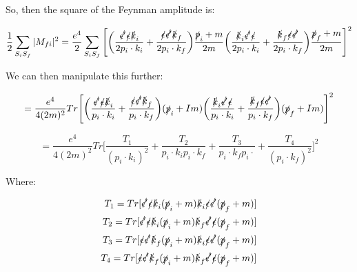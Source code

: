 \documentclass[a4]{article}
\begin{document}
    So, then the square of the Feynman amplitude is:

    \begin{equation}
        \frac{1}{2} \sum_{S_i S_f} |M_{fi}|^2 = \frac{e^4}{2} \sum_{S_i S_f} \Bigg[\bigg(\frac{\slashed{\epsilon'} \slashed{\epsilon} \slashed{k}_i}{2 p_i \cdot k_i} + \frac{\slashed{\epsilon} \slashed{\epsilon'} \slashed{k}_f}{2 p_i \cdot k_f} \bigg) \frac{\slashed{p}_i + m}{2 m} \bigg(\frac{\slashed{k}_i \slashed{\epsilon'} \slashed{\epsilon}}{2 p_i \cdot k_i} + \frac{\slashed{k}_f \slashed{\epsilon} \slashed{\epsilon'}}{2 p_i \cdot k_f} \bigg) \frac{\slashed{p}_f + m}{2 m} \Bigg]^2
    \end{equation}

    We can then manipulate this further:

    \begin{equation}
        = \frac{e^4}{4 (2m)^2} Tr \Bigg[ \bigg(\frac{\slashed{\epsilon'} \slashed{\epsilon} \slashed{k}_i}{p_i \cdot k_i} + \frac{\slashed{\epsilon} \slashed{\epsilon'} \slashed{k}_f}{p_i \cdot k_f} \bigg) (\slashed{p}_i + I m) \bigg(\frac{\slashed{k}_i \slashed{\epsilon'} \slashed{\epsilon}}{p_i \cdot k_i} + \frac{\slashed{k}_f \slashed{\epsilon} \slashed{\epsilon'}}{p_i \cdot k_f} \bigg) (\slashed{p}_f + I m) \Bigg]^2
    \end{equation}

    \begin{equation}
        = \frac{e^4}{4 (2m)^2} Tr \Bigg[ \frac{T_1}{(p_i \cdot k_i)^2} + \frac{T_2}{p_i \cdot k_i p_i \cdot k_f} + \frac{T_3}{p_i \cdot k_f p_i \cdot} + \frac{T_4}{(p_i \cdot k_f)^2} \Bigg]^2
    \end{equation}

    Where:

    \begin{equation}
        \begin{aligned}
            T_1 = Tr [\slashed{\epsilon'} \slashed{\epsilon} \slashed{k}_i (\slashed{p}_i + m) \slashed{k}_i \slashed{\epsilon} \slashed{\epsilon'} (\slashed{p}_f + m)] \\
            T_2 = Tr [\slashed{\epsilon'} \slashed{\epsilon} \slashed{k}_i (\slashed{p}_i + m) \slashed{k}_f \slashed{\epsilon'} \slashed{\epsilon} (\slashed{p}_f + m)] \\
            T_3 = Tr [\slashed{\epsilon} \slashed{\epsilon'} \slashed{k}_f (\slashed{p}_i + m) \slashed{k}_i \slashed{\epsilon} \slashed{\epsilon'} (\slashed{p}_f + m)] \\
            T_4 = Tr [\slashed{\epsilon} \slashed{\epsilon'} \slashed{k}_f (\slashed{p}_i + m) \slashed{k}_f \slashed{\epsilon'} \slashed{\epsilon} (\slashed{p}_f + m)] \\
        \end{aligned}
    \end{equation}
\end{document}
